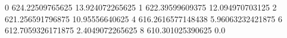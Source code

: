 0 624.22509765625 13.924072265625
1 622.39599609375 12.094970703125
2 621.256591796875 10.95556640625
4 616.2616577148438 5.96063232421875
6 612.7059326171875 2.4049072265625
8 610.301025390625 0.0
